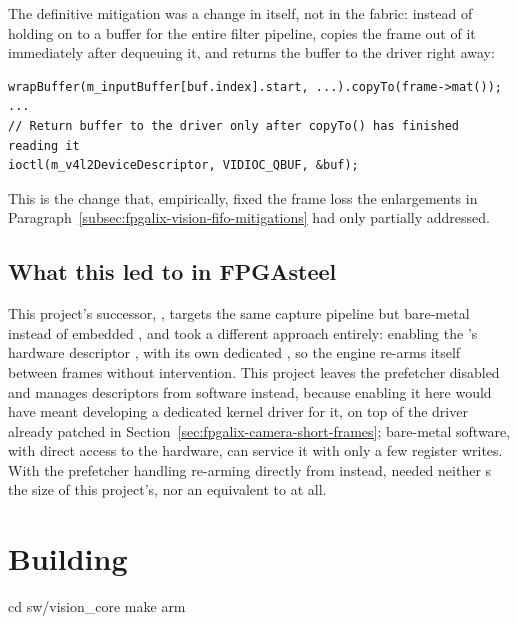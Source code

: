 The definitive mitigation was a change in  itself, not in the  fabric: instead of holding on to a  buffer for the entire filter pipeline,  copies the frame out of it immediately after dequeuing it, and returns the buffer to the driver right away:

\begin{lstlisting}
wrapBuffer(m_inputBuffer[buf.index].start, ...).copyTo(frame->mat());
...
// Return buffer to the driver only after copyTo() has finished reading it
ioctl(m_v4l2DeviceDescriptor, VIDIOC_QBUF, &buf);
\end{lstlisting}

This is the change that, empirically, fixed the frame loss the  enlargements in Paragraph~\ref{subsec:fpgalix-vision-fifo-mitigations} had only partially addressed.

\subsection{What this led to in FPGAsteel}
\label{subsec:fpgalix-vision-fpgasteel}

This project's successor, , targets the same  capture pipeline but bare-metal instead of embedded , and took a different approach entirely: enabling the 's hardware descriptor , with its own dedicated , so the  engine re-arms itself between frames without  intervention. This project leaves the prefetcher disabled and manages descriptors from software instead, because enabling it here would have meant developing a dedicated kernel driver for it, on top of the  driver already patched in Section~\ref{sec:fpgalix-camera-short-frames}; bare-metal software, with direct access to the hardware, can service it with only a few register writes. With the prefetcher handling re-arming directly from  instead,  needed neither s the size of this project's, nor an equivalent to  at all.

\section{Building}
\label{sec:fpgalix-vision-building}

\begin{shellcodehost}
cd sw/vision_core
make arm
\end{shellcodehost}

